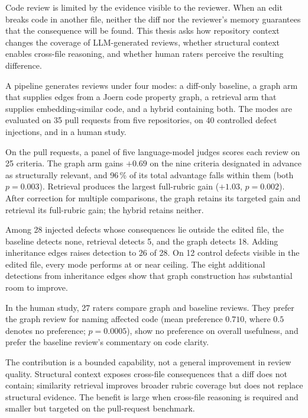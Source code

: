 Code review is limited by the evidence visible to the reviewer. When an edit
breaks code in another file, neither the diff nor the reviewer's memory
guarantees that the consequence will be found. This thesis asks how repository
context changes the coverage of LLM-generated reviews, whether structural
context enables cross-file reasoning, and whether human raters perceive the
resulting difference.

A pipeline generates reviews under four modes: a diff-only baseline, a
graph arm that supplies edges from a Joern code property graph, a
retrieval arm that supplies embedding-similar code, and a hybrid containing
both. The modes are evaluated on 35 pull requests from five repositories, on
40 controlled defect injections, and in a human study.

On the pull requests, a panel of five language-model judges scores each review
on 25 criteria. The graph arm gains $+0.69$ on the nine criteria designated
in advance as structurally relevant, and 96\,\% of its total advantage falls
within them (both $p = 0.003$). Retrieval produces the largest
full-rubric gain ($+1.03$, $p = 0.002$). After correction for multiple
comparisons, the graph retains its targeted gain and retrieval its full-rubric
gain; the hybrid retains neither.

Among 28 injected defects whose consequences lie outside the edited file, the
baseline detects none, retrieval detects 5, and the graph detects 18. Adding
inheritance edges raises detection to 26 of 28. On 12 control defects
visible in the edited file, every mode
performs at or near ceiling. The eight additional detections from inheritance
edges show that graph construction has substantial room to improve.

In the human study, 27 raters compare graph and baseline reviews.
They prefer the graph review for naming affected code (mean preference
$0.710$, where $0.5$ denotes no preference; $p = 0.0005$), show no
preference on overall usefulness, and prefer the baseline review's
commentary on code clarity.

The contribution is a bounded capability, not a general improvement in review
quality. Structural context exposes cross-file consequences that a diff does
not contain; similarity retrieval improves broader rubric coverage but does
not replace structural evidence. The benefit is large when cross-file
reasoning is required and smaller but targeted on the pull-request
benchmark.

